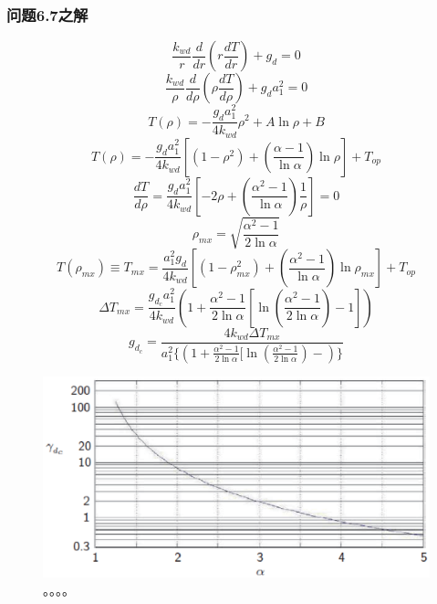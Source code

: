 \subsubsection{问题6.7之解}
\begin{equation}%
\frac{k_{wd}}{r} \frac{d}{dr}(r\frac{dT}{dr})+g_d=0
\end{equation}
\begin{equation}%
\frac{k_{wd}}{\rho}\frac{d}{d\rho}(\rho\frac{dT}{d\rho})+g_da_1^2=0
\end{equation}
\begin{equation}%
T(\rho)=-\frac{g_da_1^2}{4k_{wd}}\rho^2+A\ln\rho+B
\end{equation}
\begin{equation}%
T(\rho)=-\frac{g_da_1^2}{4k_{wd}}[(1-\rho^2)+(\frac{\alpha-1}{\ln\alpha})\ln\rho]+T_{op}
\end{equation}
\begin{equation}%
\frac{dT}{d\rho}=\frac{g_da_1^2}{4k_{wd}}[-2\rho+(\frac{\alpha^2-1}{\ln\alpha})\frac{1}{\rho}]=0
\end{equation}
\begin{equation}%
\rho_{mx}=\sqrt{\frac{\alpha^2-1}{2\ln\alpha}}
\end{equation}
\begin{equation}%
T(\rho_{mx})\equiv T_{mx}=\frac{a_1^2g_d}{4k_{wd}}[(1-\rho_{mx}^2)+(\frac{\alpha^2-1}{\ln\alpha})\ln\rho_{mx}]+T_{op}
\end{equation}
\begin{equation}%
\Delta T_{mx}=\frac{g_{d_c}a_1^2}{4k_{wd}}(1+\frac{\alpha^2-1}{2\ln\alpha}[\ln(\frac{\alpha^2-1}{2\ln\alpha})-1])
\end{equation}
\begin{equation}%
g_{d_c}=\frac{4k_{wd}\Delta T_{mx}}{a_1^2\{(1+\frac{\alpha^2-1}{2\ln\alpha}[\ln(\frac{\alpha^2-1}{2\ln\alpha})-)\}}
\end{equation}

\begin{figure}[htbp]
	\centering
	\includegraphics[scale=0.7]{chpt6/figs/fig6.22.eps}
	\caption{。。。。}
\end{figure}





